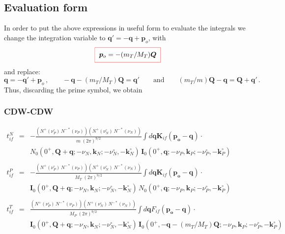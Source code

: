 \subsection{Evaluation form}

In order to put the above expressions in useful form to evaluate the
integrals we change the integration variable to $\bm{q}' =
-\bm{q}+\bm{p}_{o}$, with
\[
\fbeq{ \bm{p}_{o}=-(m_{T}/M_{T})\bm{Q}}
\]
  and replace:
\[
  \bm{q}= - \bm{q}' + \bm{p}_{o}\, , \qquad
  -\bm{q}-(m_{T}/M_{T})\bm{Q}=\bm{q}' \qquad \mbox{and} \qquad
  (m_{T}/m)\bm{Q}-\bm{q}=\bm{Q}+\bm{q}' \,.
\]
%
Thus, discarding the prime symbol, we obtain
%
\subsubsection{CDW-CDW}

\begin{eqnarray}\label{Q:tn_if-eval-form}
t^{N}_{if}&=& -\frac{\left( N^{+}(\nu_{P}^{\circ})\,N^{-*}(\nu_{P}) \right)
\left( N^{+}(\nu_{N}^{\circ})\,N^{-*}(\nu_{N}) \right)}{m \; (2 \pi)^{9/2}}
\int d \bm{q} \bm{K}_{if}(\bm{p_{o}}- \bm{q}) \cdot
  \\
&& N_{0}(0^{+}, \bm{Q} + \bm{q}; -\nu_{N}, \bm{k}_{N}; -\nu_{N}^{\circ},
-\bm{k}_{N}^{\circ} ) \, \bm{I}_{0}( 0^{+} , \bm{q};-\nu_{P},\bm{k}_{P};
-\nu_{P}^{\circ}, -\bm{k}_{P}^{\circ}) \nonumber
\\
\nonumber \\
t^{P}_{if}&=& -\frac{\left( N^{+}(\nu_{P}^{\circ})\,N^{-*}(\nu_{P}) \right)
\left( N^{+}(\nu_{N}^{\circ})\,N^{-*}(\nu_{N}) \right)}{M_{T} \; (2
\pi)^{9/2}} \int d \bm{q} \bm{K}_{if}(\bm{p_{o}}- \bm{q}) \cdot
  \\
&& \bm{I}_{0}(0^{+}, \bm{Q} + \bm{q}; -\nu_{N}, \bm{k}_{N} ; -\nu_{N}^{\circ},
-\bm{k}_{N}^{\circ}) \, N_{0}( 0^{+} , \bm{q};-\nu_{P},\bm{k}_{P}; -\nu_{P}^{\circ},
-\bm{k}_{P}^{\circ}) \nonumber
\\
\nonumber \\
t^{T}_{if}&=& \frac{\left( N^{+}(\nu_{P}^{\circ})\,N^{-*}(\nu_{P}) \right)
\left( N^{+}(\nu_{N}^{\circ})\,N^{-*}(\nu_{N}) \right)}{M_{P} \; (2
\pi)^{9/2}} \int d \bm{q} F_{if}(\bm{p_{o}}- \bm{q}) \cdot
  \\
&& \bm{I}_{0}(0^{+}, \bm{Q} + \bm{q}; -\nu_{N}, \bm{k}_{N}; -\nu_{N}^{\circ},
-\bm{k}_{N}^{\circ} ) \, \bm{I}_{0}( 0^{+} , -\bm{q} - (m_{T}/M_{T})\bm{Q} ; -
\nu_{P}, \bm{k}_{P}; -\nu_{P}^{\circ}, - \bm{k}_{P}^{\circ} ) \nonumber
\end{eqnarray}

